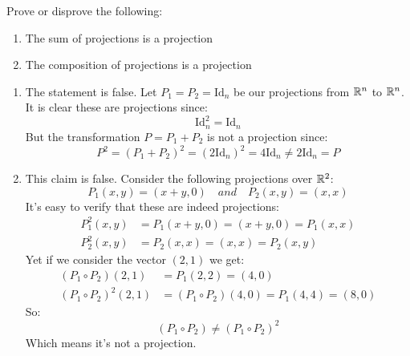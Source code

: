 \documentclass[11pt, a4paper]{article}
\begin{document}
\begin{exercise}
  Prove or disprove the following:
  \begin{enumerate}
    \item[(1)]The sum of projections is a projection
    \item[(2)]The composition of projections is a projection
  \end{enumerate}
\end{exercise}
\begin{solution} \phantom{}
\begin{enumerate}
  \item[(1)] The statement is false.
    Let $P_1 = P_2 = \mathrm{Id}_n$ be our projections from $\mathbb{R}^n$ to
$\mathbb{R}^n$. It is clear these are projections since:
\[ \mathrm{Id}_{n}^{2} = \mathrm{Id}_n \]
But the transformation $P = P_1 + P_2$ is not a projection since:
\[
  P^2 = (P_1 + P_2)^2 = (2\mathrm{Id}_n)^2 = 4\mathrm{Id}_n \neq 2\mathrm{Id}_n = P
\]

  \item[(2)] This claim is false.
  Consider the following projections over $\mathbb{R}^2$:
\[
  P_1(x,y) = (x+y,0) \quad and \quad P_2(x,y) = (x,x)
\]
It's easy to verify that these are indeed projections:
\begin{align*}
  P_1^2(x,y) &= P_1(x+y,0) = (x+y,0) = P_1(x,x) \\
  P_2^2(x,y) &= P_2(x,x) = (x,x) = P_2(x,y)
\end{align*}
Yet if we consider the vector $(2,1)$ we get:
\begin{align*}
  (P_1\circ P_2)(2,1) &= P_1(2,2) = (4,0) \\
  (P_1\circ P_2)^2(2,1) &= (P_1\circ P_2)(4,0) = P_1(4,4) = (8,0)
\end{align*}
So:
\[
  (P_1\circ P_2) \neq (P_1\circ P_2)^2
\]
Which means it's not a projection.
\end{enumerate}
\end{solution}
\end{document}
